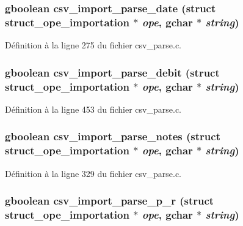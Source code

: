 \subsubsection[{csv\_\-import\_\-parse\_\-date}]{\setlength{\rightskip}{0pt plus 5cm}gboolean csv\_\-import\_\-parse\_\-date (struct {\bf struct\_\-ope\_\-importation} $\ast$ {\em ope}, \/  gchar $\ast$ {\em string})}\label{csv__parse_8h_a7cf1fb8d457bdfe6e7ded1ffcc5a5199}


Définition à la ligne 275 du fichier csv\_\-parse.c.

\subsubsection[{csv\_\-import\_\-parse\_\-debit}]{\setlength{\rightskip}{0pt plus 5cm}gboolean csv\_\-import\_\-parse\_\-debit (struct {\bf struct\_\-ope\_\-importation} $\ast$ {\em ope}, \/  gchar $\ast$ {\em string})}\label{csv__parse_8h_afad542277f2863ffd51c7e707e81afdd}


Définition à la ligne 453 du fichier csv\_\-parse.c.

\subsubsection[{csv\_\-import\_\-parse\_\-notes}]{\setlength{\rightskip}{0pt plus 5cm}gboolean csv\_\-import\_\-parse\_\-notes (struct {\bf struct\_\-ope\_\-importation} $\ast$ {\em ope}, \/  gchar $\ast$ {\em string})}\label{csv__parse_8h_a6f3afec032c7b2d6e40b54a56ad27900}


Définition à la ligne 329 du fichier csv\_\-parse.c.

\subsubsection[{csv\_\-import\_\-parse\_\-p\_\-r}]{\setlength{\rightskip}{0pt plus 5cm}gboolean csv\_\-import\_\-parse\_\-p\_\-r (struct {\bf struct\_\-ope\_\-importation} $\ast$ {\em ope}, \/  gchar $\ast$ {\em string})}\label{csv__parse_8h_a15f1fd853709db13bd92f685bed703ac}


